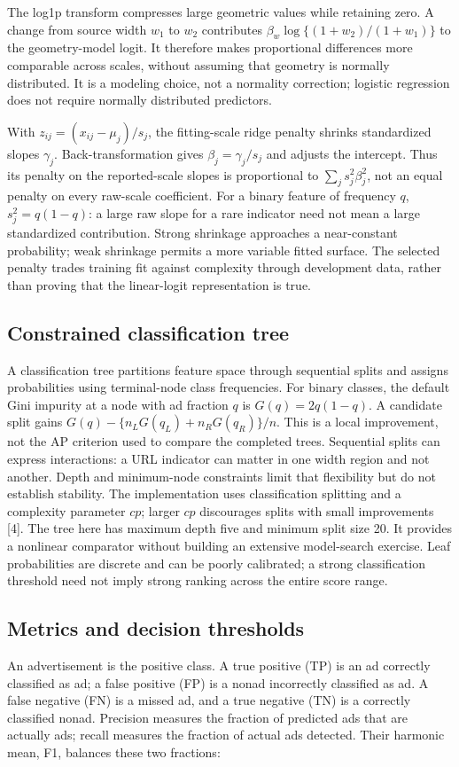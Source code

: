 \documentclass[11pt,a4paper]{article}
\newcommand{\code}[1]{\texttt{\detokenize{#1}}}
\begin{document}
The log1p transform compresses large geometric values while retaining zero. A change from source width $w_1$ to $w_2$ contributes $\beta_w\log\{(1+w_2)/(1+w_1)\}$ to the geometry-model logit. It therefore makes proportional differences more comparable across scales, without assuming that geometry is normally distributed. It is a modeling choice, not a normality correction; logistic regression does not require normally distributed predictors.

With $z_{ij}=(x_{ij}-\mu_j)/s_j$, the fitting-scale ridge penalty shrinks standardized slopes $\gamma_j$. Back-transformation gives $\beta_j=\gamma_j/s_j$ and adjusts the intercept. Thus its penalty on the reported-scale slopes is proportional to $\sum_j s_j^2\beta_j^2$, not an equal penalty on every raw-scale coefficient. For a binary feature of frequency $q$, $s_j^2=q(1-q)$: a large raw slope for a rare indicator need not mean a large standardized contribution. Strong shrinkage approaches a near-constant probability; weak shrinkage permits a more variable fitted surface. The selected penalty trades training fit against complexity through development data, rather than proving that the linear-logit representation is true.


\subsection{Constrained classification tree}
A classification tree partitions feature space through sequential splits and assigns probabilities using terminal-node class frequencies. For binary classes, the default Gini impurity at a node with ad fraction $q$ is $G(q)=2q(1-q)$. A candidate split gains $G(q)-\{n_LG(q_L)+n_RG(q_R)\}/n$. This is a local improvement, not the AP criterion used to compare the completed trees. Sequential splits can express interactions: a URL indicator can matter in one width region and not another. Depth and minimum-node constraints limit that flexibility but do not establish stability. The \code{rpart} implementation uses classification splitting and a complexity parameter $cp$; larger $cp$ discourages splits with small improvements [4]. The tree here has maximum depth five and minimum split size 20. It provides a nonlinear comparator without building an extensive model-search exercise. Leaf probabilities are discrete and can be poorly calibrated; a strong classification threshold need not imply strong ranking across the entire score range.

\subsection{Metrics and decision thresholds}
An advertisement is the positive class. A true positive (TP) is an ad correctly classified as ad; a false positive (FP) is a nonad incorrectly classified as ad. A false negative (FN) is a missed ad, and a true negative (TN) is a correctly classified nonad. Precision measures the fraction of predicted ads that are actually ads; recall measures the fraction of actual ads detected. Their harmonic mean, F1, balances these two fractions:
\end{document}

